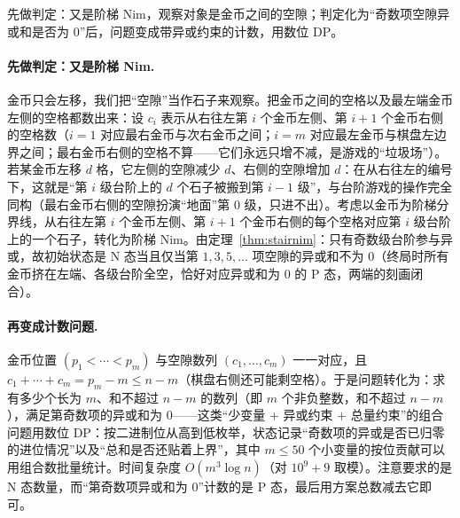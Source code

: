 \hint 先做判定：又是阶梯 Nim，观察对象是金币之间的空隙；判定化为“奇数项空隙异或和是否为 $0$”后，问题变成带异或约束的计数，用数位 DP。

\sol \paragraph{先做判定：又是阶梯 Nim.} 金币只会左移，我们把“空隙”当作石子来观察。把金币之间的空格以及最左端金币左侧的空格都数出来：设 $c_i$ 表示从右往左第 $i$ 个金币左侧、第 $i+1$ 个金币右侧的空格数（$i=1$ 对应最右金币与次右金币之间；$i=m$ 对应最左金币与棋盘左边界之间；最右金币右侧的空格不算——它们永远只增不减，是游戏的“垃圾场”）。若某金币左移 $d$ 格，它左侧的空隙减少 $d$、右侧的空隙增加 $d$：在从右往左的编号下，这就是“第 $i$ 级台阶上的 $d$ 个石子被搬到第 $i-1$ 级”，与台阶游戏的操作完全同构（最右金币右侧的空隙扮演“地面”第 $0$ 级，只进不出）。考虑以金币为阶梯分界线，从右往左第 $i$ 个金币左侧、第 $i+1$ 个金币右侧的每个空格对应第 $i$ 级台阶上的一个石子，转化为阶梯 Nim。由定理~\ref{thm:stairnim}：只有奇数级台阶参与异或，故初始状态是 N 态当且仅当第 $1,3,5,\ldots$ 项空隙的异或和不为 $0$（终局时所有金币挤在左端、各级台阶全空，恰好对应异或和为 $0$ 的 P 态，两端的刻画闭合）。

\paragraph{再变成计数问题.} 金币位置 $(p_1<\cdots<p_m)$ 与空隙数列 $(c_1,\ldots,c_m)$ 一一对应，且 $c_1+\cdots+c_m=p_m-m\le n-m$（棋盘右侧还可能剩空格）。于是问题转化为：求有多少个长为 $m$、和不超过 $n-m$ 的数列（即 $m$ 个非负整数，和不超过 $n-m$），满足第奇数项的异或和为 $0$——这类“少变量 + 异或约束 + 总量约束”的组合问题用数位 DP：按二进制位从高到低枚举，状态记录“奇数项的异或是否已归零的进位情况”以及“总和是否还贴着上界”，其中 $m\le50$ 个小变量的按位贡献可以用组合数批量统计。时间复杂度 $O(m^{3}\log n)$（对 $10^{9}+9$ 取模）。注意要求的是 N 态数量，而“第奇数项异或和为 $0$”计数的是 P 态，最后用方案总数减去它即可。


